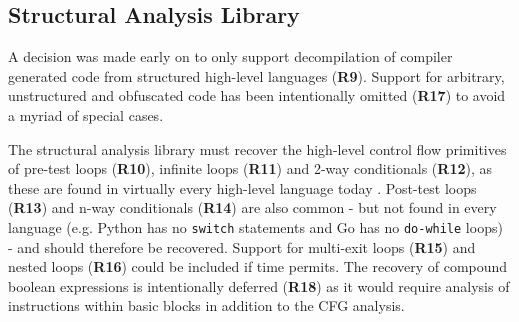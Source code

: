 
\subsection{Structural Analysis Library}

A decision was made early on to only support decompilation of compiler generated code from structured high-level languages (\textbf{R9}). Support for arbitrary, unstructured and obfuscated code has been intentionally omitted (\textbf{R17}) to avoid a myriad of special cases.

The structural analysis library must recover the high-level control flow primitives of pre-test loops (\textbf{R10}), infinite loops (\textbf{R11}) and 2-way conditionals (\textbf{R12}), as these are found in virtually every high-level language today \cite{reverse_comp}. Post-test loops (\textbf{R13}) and n-way conditionals (\textbf{R14}) are also common - but not found in every language (e.g. Python has no \texttt{switch} statements and Go has no \texttt{do-while} loops) - and should therefore be recovered. Support for multi-exit loops (\textbf{R15}) and nested loops (\textbf{R16}) could be included if time permits. The recovery of compound boolean expressions is intentionally deferred (\textbf{R18}) as it would require analysis of instructions within basic blocks in addition to the CFG analysis.

